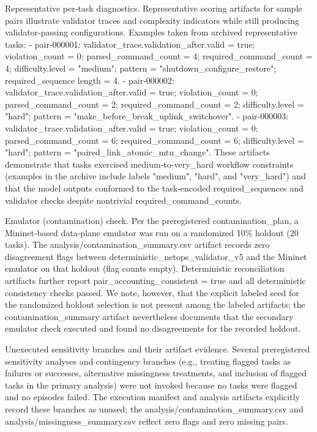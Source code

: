 \documentclass[conference]{IEEEtran}
\begin{document}
Representative per‑task diagnostics. Representative scoring artifacts for sample pairs illustrate validator traces and complexity indicators while still producing validator‑passing configurations. Examples taken from archived representative tasks:
- pair‑000001: validator\_trace.validation\_after.valid = true; violation\_count = 0; parsed\_command\_count = 4; required\_command\_count = 4; difficulty.level = "medium"; pattern = "shutdown\_configure\_restore"; required\_sequence length = 4.
- pair‑000002: validator\_trace.validation\_after.valid = true; violation\_count = 0; parsed\_command\_count = 2; required\_command\_count = 2; difficulty.level = "hard"; pattern = "make\_before\_break\_uplink\_switchover".
- pair‑000003: validator\_trace.validation\_after.valid = true; violation\_count = 0; parsed\_command\_count = 6; required\_command\_count = 6; difficulty.level = "hard"; pattern = "paired\_link\_atomic\_mtu\_change".
These artifacts demonstrate that tasks exercised medium‑to‑very\_hard workflow constraints (examples in the archive include labels "medium", "hard", and "very\_hard") and that the model outputs conformed to the task‑encoded required\_sequences and validator checks despite nontrivial required\_command\_counts.

Emulator (contamination) check. Per the preregistered contamination\_plan, a Mininet‑based data‑plane emulator was run on a randomized 10\% holdout (20 tasks). The analysis/contamination\_summary.csv artifact records zero disagreement flags between deterministic\_netops\_validator\_v5 and the Mininet emulator on that holdout (flag counts empty). Deterministic reconciliation artifacts further report pair\_accounting\_consistent = true and all deterministic consistency checks passed. We note, however, that the explicit labeled seed for the randomized holdout selection is not present among the labeled artifacts; the contamination\_summary artifact nevertheless documents that the secondary emulator check executed and found no disagreements for the recorded holdout.

Unexecuted sensitivity branches and their artifact evidence. Several preregistered sensitivity analyses and contingency branches (e.g., treating flagged tasks as failures or successes, alternative missingness treatments, and inclusion of flagged tasks in the primary analysis) were not invoked because no tasks were flagged and no episodes failed. The execution manifest and analysis artifacts explicitly record these branches as unused; the analysis/contamination\_summary.csv and analysis/missingness\_summary.csv reflect zero flags and zero missing pairs.
\end{document}
